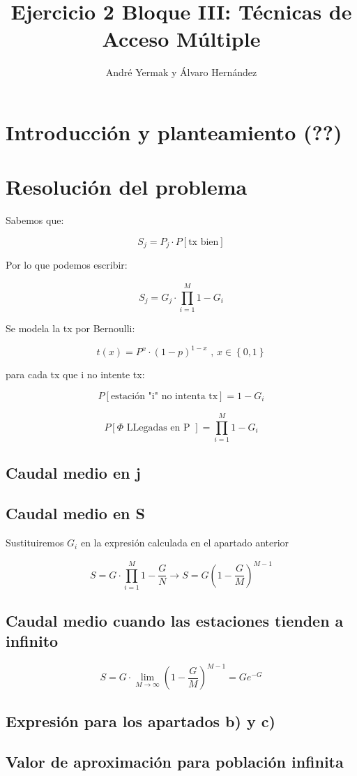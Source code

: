 \documentclass{article}
\title{Ejercicio 2 Bloque III: Técnicas de Acceso Múltiple}
\author{André Yermak y Álvaro Hernández}
\begin{document}
\maketitle


\section{Introducción y planteamiento (??)}


\section{Resolución del problema}

Sabemos que:

$$S_j = P_j \cdot P[\text{tx bien}]$$

Por lo que podemos escribir:

$$S_j = G_j \cdot \prod_{i=1}^{\substack{M}} 1 - G_i$$

Se modela la tx por Bernoulli:

$$t(x) = P^x \cdot (1-p)^{1-x} \text{ , } x \in \left\{0, 1\right\}$$


para cada tx que i no intente tx:

$$P[\text{estación "i" no intenta tx}] = 1 - G_{i}$$

$$P[ \varPhi \text{ LLegadas en P } ] = \prod_{i=1}^{\substack{M}} 1 - G_i $$

\subsection{Caudal medio en j}


\subsection{Caudal medio en S}

Sustituiremos $G_{i}$ en la expresión calculada en el apartado anterior

$$S = G \cdot \prod_{i=1}^{\substack{M}} 1 - \frac{G}{N} \rightarrow S = G(1 - \frac{G}{M})^{M-1}$$


\subsection{Caudal medio cuando las estaciones tienden a infinito}

$$S = G \cdot \lim_{M \to \infty}(1 - \frac{G}{M})^{M-1} = Ge^{-G}$$

\subsection{Expresión para los apartados b) y c) }

\subsection{Valor de aproximación para población infinita}
\end{document}

